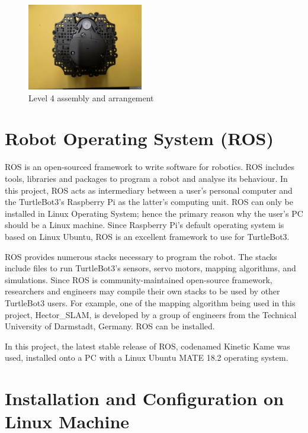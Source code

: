 \documentclass[12pt]{report}
\begin{document}
\begin{figure}[H]
        \centering
        \includegraphics[width=0.45\textwidth]{Fig6.png}
        \caption{Level 4 assembly and arrangement}
        \label{fig:6}
    \end{figure}
\vspace{1em}
\vfill
\section{Robot Operating System (ROS)}
ROS is an open-sourced framework to write software for robotics. ROS includes tools, libraries and packages to program a robot and analyse its behaviour. In this project, ROS acts as intermediary between a user’s personal computer and the TurtleBot3’s Raspberry Pi as the latter’s computing unit. ROS can only be installed in Linux Operating System; hence the primary reason why the user’s PC should be a Linux machine. Since Raspberry Pi’s default operating system is based on Linux Ubuntu, ROS is an excellent framework to use for TurtleBot3.\par
\vspace{1em}
ROS provides numerous stacks necessary to program the robot. The stacks include files to run TurtleBot3’s sensors, servo motors, mapping algorithms, and simulations. Since ROS is community-maintained open-source framework, researchers and engineers may compile their own stacks to be used by other TurtleBot3 users. For example, one of the mapping algorithm being used in this project, Hector\_SLAM, is developed by a group of engineers from the Technical University of Darmstadt, Germany. ROS can be installed.\par
\vspace{1em}
In this project, the latest stable release of ROS, codenamed Kinetic Kame was used, installed onto a PC with a Linux Ubuntu MATE 18.2 operating system.\par

\section{Installation and Configuration on Linux Machine}
\end{document}
